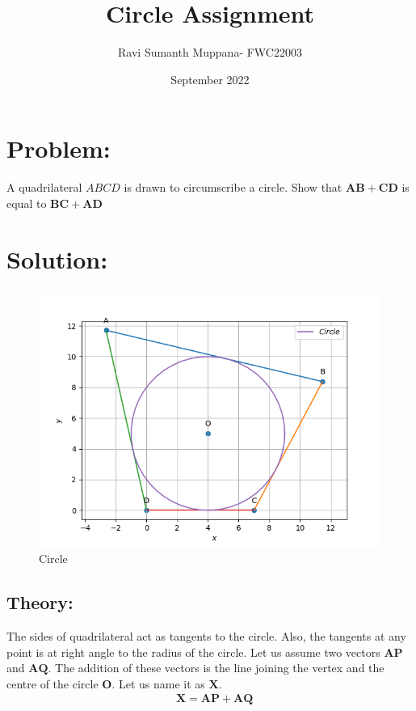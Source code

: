 \documentclass[a4paper,12pt,twocolumn]{article}
\title{Circle Assignment}
\author{Ravi Sumanth Muppana- FWC22003}
\date{September 2022}
\let\vec\mathbf
\begin{document}
\maketitle
\section{Problem:}
A quadrilateral $ABCD$ is drawn to circumscribe a circle. Show that $\vec{AB+CD}$ is equal to $\vec{BC+AD}$
\maketitle
\section{Solution:}
\begin{figure}[h]
	\includegraphics[width=\linewidth]{circle.png}
	\caption{Circle}
\end{figure}
\subsection{Theory:}
The sides of quadrilateral act as tangents to the circle. Also, the tangents at any point is at right angle to the radius of the circle. Let us assume two vectors $\vec{AP}$ and $\vec{AQ}$. The addition of these vectors is the line joining the vertex and the centre of the circle $\vec{O}$. Let us name it as $\vec{X}$.
\begin{align*}
&\vec{X} = \vec{AP+AQ}
\end{align*}
\end{document}
